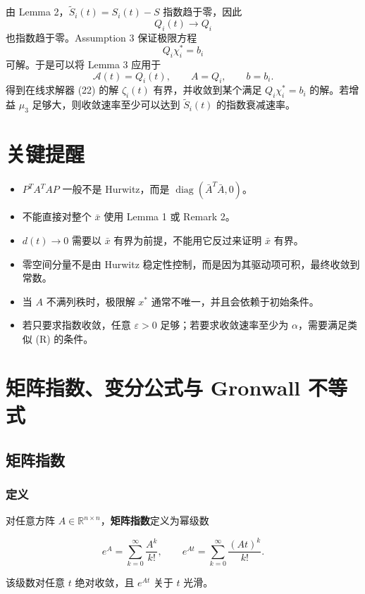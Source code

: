 \documentclass[UTF8,fontset=fandol]{ctexart}
\newcommand{\R}{\mathbb{R}}
\newcommand{\diag}{\operatorname{diag}}
\begin{document}
由 Lemma 2，$\tilde{S}_i(t)=S_i(t)-S$ 指数趋于零，因此
\[
Q_i(t)\to Q_i
\]
也指数趋于零。Assumption 3 保证极限方程
\[
Q_i\chi_i^*=b_i
\]
可解。于是可以将 Lemma 3 应用于
\[
\mathcal{A}(t)=Q_i(t),\qquad A=Q_i,\qquad b=b_i.
\]
得到在线求解器 (22) 的解 $\zeta_i(t)$ 有界，并收敛到某个满足
$Q_i\chi_i^*=b_i$ 的解。若增益 $\mu_3$ 足够大，则收敛速率至少可以达到
$\tilde{S}_i(t)$ 的指数衰减速率。

\section{关键提醒}

\begin{itemize}
  \item $P^{T}A^{T}AP$ 一般不是 Hurwitz，而是
  $\diag(\bar{A}^{T}\bar{A},0)$。
  \item 不能直接对整个 $\bar{x}$ 使用 Lemma 1 或 Remark 2。
  \item $d(t)\to0$ 需要以 $\bar{x}$ 有界为前提，不能用它反过来证明 $\bar{x}$ 有界。
  \item 零空间分量不是由 Hurwitz 稳定性控制，而是因为其驱动项可积，最终收敛到常数。
  \item 当 $A$ 不满列秩时，极限解 $x^*$ 通常不唯一，并且会依赖于初始条件。
  \item 若只要求指数收敛，任意 $\varepsilon>0$ 足够；若要求收敛速率至少为
  $\alpha$，需要满足类似 (R) 的条件。
\end{itemize}

\appendix

\section{矩阵指数、变分公式与 Gronwall 不等式}

\subsection{矩阵指数}

\subsubsection*{定义}

对任意方阵 $A \in \R^{n\times n}$，\textbf{矩阵指数}定义为幂级数

\[
e^{A} = \sum_{k=0}^{\infty} \frac{A^k}{k!},
\qquad
e^{At} = \sum_{k=0}^{\infty} \frac{(At)^k}{k!}.
\]

该级数对任意 $t$ 绝对收敛，且 $e^{At}$ 关于 $t$ 光滑。
\end{document}

